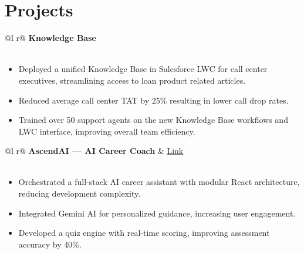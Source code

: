 \documentclass[a4paper,10pt]{article}
\begin{document}
\section*{Projects}

\begin{tabularx}{\linewidth}{@{}l r@{}}
\textbf{Knowledge Base} \\
 \\
{
\begin{minipage}[t]{\linewidth}
\vspace{-6pt}
\begin{itemize}[leftmargin=1.3em, itemsep=3pt]
    \item Deployed a unified Knowledge Base in Salesforce LWC for call center executives, streamlining access to loan product related articles.  
\item Reduced average call center TAT by 25\% resulting in lower call drop rates.  
\item Trained over 50 support agents on the new Knowledge Base workflows and LWC interface, improving overall team efficiency.  

\end{itemize}
\end{minipage}
}
\end{tabularx}

\begin{tabularx}{\linewidth}{@{}l r@{}}
\textbf{AscendAI — AI Career Coach} & \href{https://ascend-ai-rho.vercel.app/}{Link} \\
 \\
{
\begin{minipage}[t]{\linewidth}
\vspace{-6pt}
\begin{itemize}[leftmargin=1.3em, itemsep=3pt]
    \item Orchestrated a full-stack AI career assistant with modular React architecture, reducing development complexity.
    \item Integrated Gemini AI for personalized guidance, increasing user engagement.
    \item Developed a quiz engine with real-time scoring, improving assessment accuracy by 40\%.
\end{itemize}
\end{minipage}
}
\end{tabularx}
\end{document}
